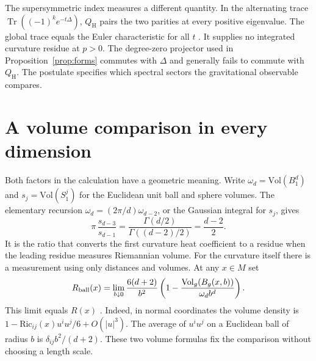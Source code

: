 \documentclass[aps,prd,reprint,onecolumn,nofootinbib,amsmath,amssymb]{revtex4-2}
\newcommand{\Tr}{\operatorname{Tr}}
\begin{document}
The supersymmetric index measures a different quantity. In the alternating
trace \(\Tr((-1)^k e^{-t\Delta})\), \(Q_{\mathrm H}\) pairs the two
parities at every positive eigenvalue. The global trace equals the Euler
characteristic for all \(t\) \cite{WittenMorse1982}. It supplies no
integrated curvature residue at \(p>0\). The degree-zero projector used in
Proposition~\ref{prop:forms} commutes with \(\Delta\) and generally fails
to commute with \(Q_{\mathrm H}\). The postulate specifies which spectral
sectors the gravitational observable compares.

\section{A volume comparison in every dimension}\label{sec:volume}

Both factors in the calculation have a geometric meaning. Write
\(\omega_d=\mathrm{Vol}(B^d_1)\) and \(s_j=\mathrm{Vol}(S^j_1)\)
for the Euclidean unit ball and sphere volumes. The elementary recursion
\(\omega_d=(2\pi/d)\omega_{d-2}\), or the Gaussian integral for \(s_j\),
gives
\begin{equation}
 \pi\,\frac{s_{d-3}}{s_{d-1}}
 =\frac{\Gamma(d/2)}{\Gamma((d-2)/2)}
 =\frac{d-2}{2}.
 \label{eq:areas}
\end{equation}
It is the ratio that converts the first curvature heat coefficient to a
residue when the leading residue measures Riemannian volume. For the
curvature itself there is a measurement using only distances and volumes.
At any \(x\in M\) set
\begin{equation}
 R_{\rm ball}(x)=
 \lim_{b\downarrow0}\frac{6(d+2)}{b^2}
 \left(1-\frac{\mathrm{Vol}_g(B_g(x,b))}{\omega_d b^d}\right).
 \label{eq:geodesic}
\end{equation}
This limit equals \(R(x)\) \cite{GrayVanhecke1979}. Indeed, in normal
coordinates the volume density is
\(1-\mathrm{Ric}_{ij}(x)u^iu^j/6+O(|u|^3)\).
The average of \(u^iu^j\) on a Euclidean ball of radius \(b\) is
\(\delta_{ij}b^2/(d+2)\). These two volume formulas fix the comparison
without choosing a length scale.
\end{document}

